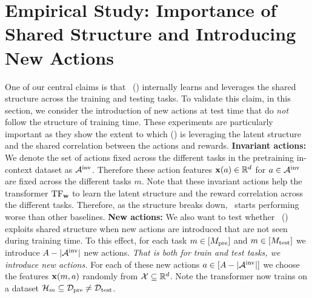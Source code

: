 \documentclass[10pt]{article}
\theoremstyle{plain}
\theoremstyle{definition}
\theoremstyle{remark}
\begin{document}
\section{Empirical Study: Importance of Shared Structure and Introducing New Actions}
\label{sec:new-actions}
\vspace*{-0.5em}
One of our central claims is that \pred\ (\gt) internally learns and leverages the shared structure across the training and testing tasks.
To validate this claim, in this section, we consider the introduction of new actions at test time that do \textit{not} follow the structure of training time.
These experiments are particularly important as they show the extent to which \pred (\gt) is leveraging the latent structure and the shared correlation between the actions and rewards.
\textbf{Invariant actions:} We denote the set of actions fixed across the different tasks in the pretraining in-context dataset as $\mathcal{A}^{\text{inv}}$. Therefore these action features $\mathbf{x}(a)\in\mathbb{R}^d$ for $a\in \mathcal{A}^{\text{inv}}$ are fixed across the different tasks $m$. Note that these invariant actions help the transformer $\mathrm{TF}_{\mathbf{w}}$ to learn the latent structure and the reward correlation across the different tasks. Therefore, as the structure breaks down, \pred\ starts performing worse than other baselines.
\textbf{New actions:} We also want to test whether \pred\ (\gt) exploits shared structure when new actions are introduced that are not seen during training time. To this effect, for each task $m\in [M_{\text{pre}}]$ and $m\in [M_{\text{test}}]$ we introduce $A - |\mathcal{A}^{\text{inv}}|$ new actions. \textit{That is both for train and test tasks, we introduce new actions.}  For each of these new actions $a\in [A - |\mathcal{A}^{\text{inv}}|]$ we choose the features $\mathbf{x}(m,a)$ randomly from $\mathcal{X}\subseteq\mathbb{R}^d$. Note the transformer now trains on a dataset $\mathcal{H}_m \subseteq \mathcal{D}_{\text{pre}} \neq \mathcal{D}_{\text{test}}$.
\end{document}
